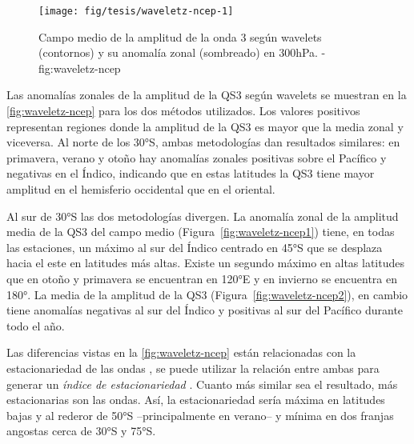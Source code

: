 \documentclass[spanish,a4paper,12p]{book}
\begin{document}

\begin{figure}

{\centering \texttt{[image: fig/tesis/waveletz-ncep-1]} 

}

\caption{Campo medio de la amplitud de la onda 3 según wavelets (contornos) y su anomalía zonal (sombreado) en 300hPa. - fig:waveletz-ncep}\label{fig:waveletz-ncep}
\end{figure}

Las anomalías zonales de la amplitud de la QS3 según wavelets se
muestran en la \autoref{fig:waveletz-ncep} para los dos métodos
utilizados. Los valores positivos representan regiones donde la amplitud
de la QS3 es mayor que la media zonal y viceversa. Al norte de los 30°S,
ambas metodologías dan resultados similares: en primavera, verano y
otoño hay anomalías zonales positivas sobre el Pacífico y negativas en
el Índico, indicando que en estas latitudes la QS3 tiene mayor amplitud
en el hemisferio occidental que en el oriental.

Al sur de 30°S las dos metodologías divergen. La anomalía zonal de la
amplitud media de la QS3 del campo medio
(Figura~\ref{fig:waveletz-ncep1}) tiene, en todas las estaciones, un
máximo al sur del Índico centrado en 45°S que se desplaza hacia el este
en latitudes más altas. Existe un segundo máximo en altas latitudes que
en otoño y primavera se encuentran en 120°E y en invierno se encuentra
en 180°. La media de la amplitud de la QS3
(Figura~\ref{fig:waveletz-ncep2}), en cambio tiene anomalías negativas
al sur del Índico y positivas al sur del Pacífico durante todo el año.

Las diferencias vistas en la \autoref{fig:waveletz-ncep} están
relacionadas con la estacionariedad de las ondas
,
se puede utilizar la relación entre ambas para generar un \emph{índice
de estacionariedad} . Cuanto más
similar sea el resultado, más estacionarias son las ondas. Así, la
estacionariedad sería máxima en latitudes bajas y al rederor de 50°S
--principalmente en verano-- y mínima en dos franjas angostas cerca de
30°S y 75°S. 
\end{document}

